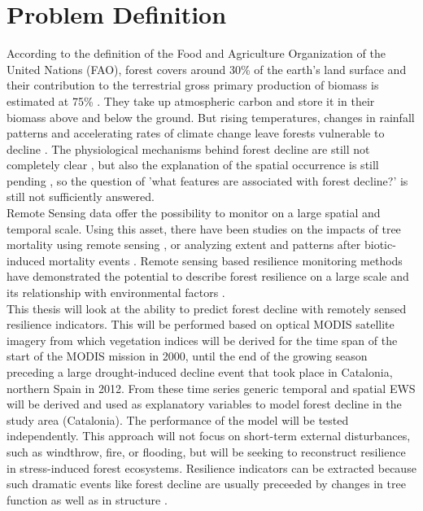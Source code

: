 \section{Problem Definition}\label{sec:problem}
According to the definition of the Food and Agriculture Organization of the United Nations (FAO), forest covers around 30\% of the earth's land surface  and their contribution to the terrestrial gross primary production of biomass is estimated at 75\% \citep{beer2010}. They take up atmospheric carbon and store it in their  biomass above and below the ground. But rising temperatures, changes in rainfall patterns and accelerating rates of climate change leave forests vulnerable to decline \citep{choat2012}. The physiological mechanisms behind forest decline are still not completely clear \citep{sala2010}, but also the explanation of the spatial occurrence is still pending \citep{chaparro2017}, so the question of 'what features are associated with forest decline?' is still not sufficiently answered.\\
Remote Sensing data offer the possibility to monitor on a large spatial and temporal scale. Using this asset, there have been studies on the impacts of tree mortality using remote sensing \citep[e.g.][]{breshears2005, meigs2011}, or analyzing extent and patterns after biotic-induced mortality events \citep[e.g.][]{meddens2012, wulder2006}. Remote sensing based resilience monitoring methods have demonstrated the potential to describe forest resilience on a large scale and its relationship with environmental factors \citep{keersmaecker2014, verbesselt2016}.\\
This thesis will look at the ability to predict forest decline with remotely sensed resilience indicators. This will be performed based on optical MODIS satellite imagery from which vegetation indices will be derived for the time span of the start of the MODIS mission in 2000, until the end of the growing season preceding a large drought-induced decline event that took place in Catalonia, northern Spain in 2012. From these time series generic temporal and spatial EWS will be derived and used as explanatory variables to model forest decline in the study area (Catalonia). The performance of the model will be tested independently. This approach will not focus on short-term external disturbances, such as windthrow, fire, or flooding, but will be seeking to reconstruct resilience in stress-induced forest ecosystems. Resilience indicators can be extracted because such dramatic events like forest decline are usually preceeded by changes in tree function as well as in structure \citep{hartmann2015}.\\
